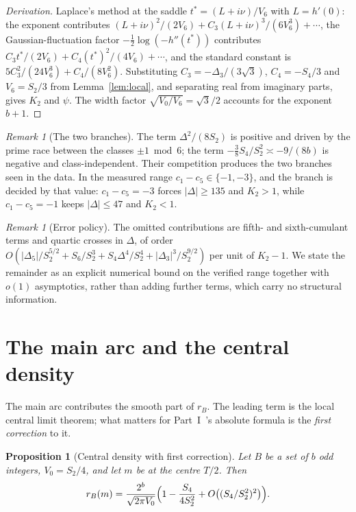 \documentclass[11pt,a4paper]{article}
\theoremstyle{plain}
\newtheorem{proposition}[theorem]{Proposition}
\theoremstyle{definition}
\theoremstyle{remark}
\newtheorem{remark}[theorem]{Remark}
\begin{document}
\begin{proof}[Derivation]
Laplace's method at the saddle $t^{*}=(L+i\nu)/V_6$ with $L=h'(0)$: the exponent
contributes $(L+i\nu)^{2}/(2V_6)+C_3(L+i\nu)^{3}/(6V_6^{3})+\cdots$, the
Gaussian-fluctuation factor $-\frac12\log(-h''(t^{*}))$ contributes
$C_3t^{*}/(2V_6)+C_4(t^{*})^{2}/(4V_6)+\cdots$, and the standard constant is
$5C_3^{2}/(24V_6^{3})+C_4/(8V_6^{2})$. Substituting
$C_3=-\Delta_3/(3\sqrt3)$, $C_4=-S_4/3$ and $V_6=S_2/3$ from
Lemma~\ref{lem:local}, and separating real from imaginary parts, gives $K_2$ and
$\psi$. The width factor $\sqrt{V_0/V_6}=\sqrt3/2$ accounts for the exponent
$b+1$.
\end{proof}

\begin{remark}[The two branches]\label{rem:branches}
The term $\Delta^{2}/(8S_2)$ is positive and driven by the prime race between
the classes $\pm1\bmod6$; the term $-\tfrac38 S_4/S_2^{2}\asymp-9/(8b)$ is
negative and class-independent. Their competition produces the two branches seen
in the data. In the measured range $c_1-c_5\in\{-1,-3\}$, and the branch is
decided by that value: $c_1-c_5=-3$ forces $|\Delta|\ge135$ and $K_2>1$, while
$c_1-c_5=-1$ keeps $|\Delta|\le47$ and $K_2<1$.
\end{remark}

\begin{remark}[Error policy]\label{rem:error}
The omitted contributions are fifth- and sixth-cumulant terms and quartic
crosses in $\Delta$, of order
$O(|\Delta_5|/S_2^{5/2}+S_6/S_2^{3}+S_4\Delta^{4}/S_2^{4}+|\Delta_3|^{3}/S_2^{9/2})$
per unit of $K_2-1$. We state the remainder as an explicit numerical bound on
the verified range together with $o(1)$ asymptotics, rather than adding further
terms, which carry no structural information.
\end{remark}

\section{The main arc and the central density}\label{sec:m2}

The main arc contributes the smooth part of $r_B$. The leading term is the local
central limit theorem; what matters for Part~I~\cite{P1}'s absolute formula
is the \emph{first correction} to it.

\begin{proposition}[Central density with first correction]\label{prop:central}
Let $B$ be a set of $b$ odd integers, $V_0=S_2/4$, and let $m$ be at the centre
$T/2$. Then
\[
  r_B(m)=\frac{2^{b}}{\sqrt{2\pi V_0}}\Bigl(1-\frac{S_4}{4S_2^{2}}+O\bigl((S_4/S_2^{2})^{2}\bigr)\Bigr).
\]
\end{proposition}
\end{document}
